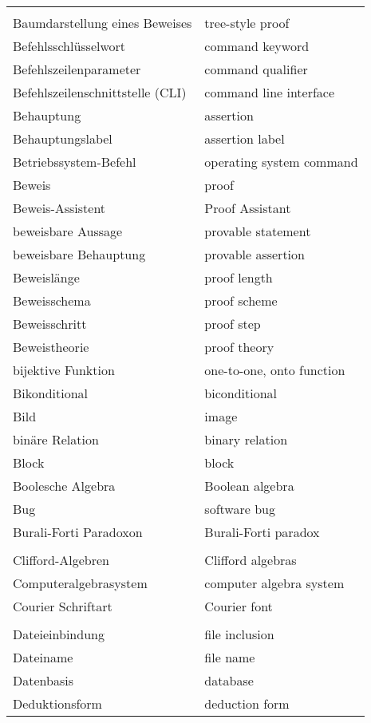 \begin{longtabu}   { @{} X[l] X[l] }
     & \\
    Baumdarstellung eines Beweises & tree-style proof \\
    Befehlsschlüsselwort & command keyword \\
    Befehlszeilenparameter & command qualifier \\
    Befehlszeilenschnittstelle (CLI) & command line interface \\
    Behauptung & assertion \\
    Behauptungslabel & assertion label \\
    Betriebssystem-Befehl & operating system command \\
    Beweis & proof \\
    Beweis-Assistent & Proof Assistant \\
    beweisbare Aussage & provable statement \\
    beweisbare Behauptung & provable assertion \\
    Beweislänge & proof length \\
    Beweisschema & proof scheme \\
    Beweisschritt & proof step \\
    Beweistheorie & proof theory \\
    bijektive Funktion & one-to-one, onto function \\
    Bikonditional & biconditional \\
    Bild & image \\
    binäre Relation & binary relation \\
    Block & block \\
    Boolesche Algebra & Boolean algebra \\
    Bug & software bug \\
    Burali-{\allowbreak}Forti Paradoxon & Burali-{\allowbreak}Forti paradox \\
     & \\
    Clifford-{\allowbreak}Algebren & Clifford algebras \\
    Computeralgebrasystem & computer algebra system \\
    Courier Schriftart & Courier font \\
     & \\
    Dateieinbindung & file inclusion \\
    Dateiname & file name \\
    Datenbasis & database \\
    Deduktionsform & deduction form \\

\end{longtabu}
